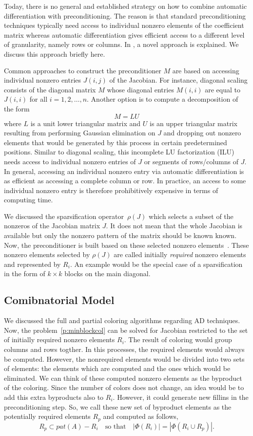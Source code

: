 \documentclass[12pt, oneside]{book}
\newcommand{\sparsifysymbol}{\ensuremath{\rho}}
\newcommand{\sparsify}[1]{\ensuremath{\sparsifysymbol(#1)}}
\begin{document}
Today, there is no general and established
strategy on how to combine automatic differentiation with preconditioning. The reason is
that standard preconditioning techniques typically need access to individual nonzero
elements of the coefficient matrix whereas automatic differentiation gives efficient
access to a different level of granularity, namely rows or columns.
In \cite{Lulfesmann2012Fap}, a novel approach is explained.
We discuss this approach briefly here.

Common approaches to construct the preconditioner $M$ are based on accessing individual
nonzero entries $J(i,j)$ of the Jacobian. For instance, diagonal scaling consists of the
diagonal matrix $M$ whose diagonal entries $M(i,i)$ are equal to $J(i,i)$ for all
$i=1,2,\dots, n$. Another option is to compute a decomposition of the form
$$
M = LU
$$
where $L$ is a unit lower triangular matrix and $U$ is an upper triangular matrix
resulting from performing Gaussian elimination on $J$ and dropping out nonzero elements
that would be generated by this process in certain predetermined positions. Similar to
diagonal scaling, this incomplete LU factorization (ILU) needs access to individual
nonzero entries of $J$ or segments of rows/columns of $J$. In general, accessing an
individual nonzero entry via automatic differentiation is as efficient as accessing a
complete column or row. In practice, an access to some individual nonzero entry is
therefore prohibitively expensive in terms of computing time.

We discussed the sparsification operator~\sparsify{J} 
which selects a subset of the nonzeros of the Jacobian matrix $J$. 
It does not mean that the whole Jacobian is available but 
only the nonzero pattern of the matrix should be known known.
Now, the preconditioner is built based on these selected nonzero elements~\cite{Cullum2006}.
These nonzero elements selected by \sparsify{J} are called initially 
\emph{required} nonzero elements and represented by $R_i$. 
An example would be the special case of a sparsification in the form of $k\times k$
blocks on the main diagonal.
\subsection{Comibnatorial Model}
We discussed the full and partial coloring algorithms regarding AD techniques. 
Now, the problem~\ref{p:minblockcol} can be solved for Jacobian
restricted to the set of initially
required nonzero elements $R_i$. The result of coloring would group
columns and rows togther. In this processes, the required elements would always
be computed. However, the nonrequired elements would be divided into two sets of
elements: the elements which are computed and the ones which would be 
eliminated. We can think of these computed nonzero elements as the byproduct
of the coloring. Since the number of colors does not change, 
an idea would be to add this extra byproducts also to $R_i$.
However, it could generate new fillins in the preconditioning step.
So, we call these new set of byproduct elements as the potentially
required elements $R_p$ and computed as follows,
$$
R_p \subset pat(A) - R_i \quad\text{so that}\quad |\Phi(R_i)| = |\Phi(R_i\cup R_p)|.
$$ 
\end{document}
